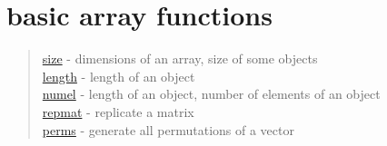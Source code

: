 \chapter*{basic array functions}

\begin{quote}
\noindent
\hyperlink{size}{size} - dimensions of an array, size of some objects \\
\hyperlink{length}{length} - length of an object  \\
\hyperlink{numel}{numel} - length of an object, number of elements of an object  \\
\hyperlink{repmat}{repmat} - replicate a matrix\\
\hyperlink{perms}{perms} - generate all permutations of a vector\\
\end{quote}

%




